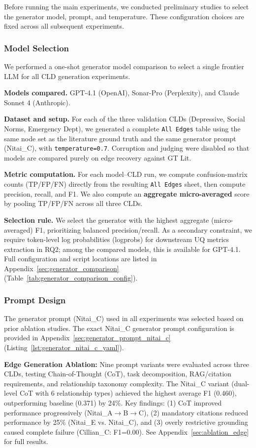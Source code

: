 Before running the main experiments, we conducted preliminary studies to select the generator model, prompt, and temperature. These configuration choices are fixed across all subsequent experiments.

\subsubsection{Model Selection}

We performed a one-shot generator model comparison to select a single frontier LLM for all CLD generation experiments.

\textbf{Models compared.} GPT-4.1 (OpenAI), Sonar-Pro (Perplexity), and Claude Sonnet 4 (Anthropic).

\textbf{Dataset and setup.} For each of the three validation CLDs (Depressive, Social Norms, Emergency Dept), we generated a complete \texttt{All Edges} table using the same node set as the literature ground truth and the same generator prompt (Nitai\_C), with \texttt{temperature=0.7}. Corruption and judging were disabled so that models are compared purely on edge recovery against GT Lit.

\textbf{Metric computation.} For each model--CLD run, we compute confusion-matrix counts (TP/FP/FN) directly from the resulting \texttt{All Edges} sheet, then compute precision, recall, and F1. We also compute an \textbf{aggregate micro-averaged} score by pooling TP/FP/FN across all three CLDs.

\textbf{Selection rule.} We select the generator with the highest aggregate (micro-averaged) F1, prioritizing balanced precision/recall. As a secondary constraint, we require token-level log probabilities (logprobs) for downstream UQ metrics extraction in RQ2; among the compared models, this is available for GPT-4.1.
Full configuration and script locations are listed in Appendix~\ref{sec:generator_comparison} (Table~\ref{tab:generator_comparison_config}).

\subsubsection{Prompt Design}

The generator prompt (Nitai\_C) used in all experiments was selected based on prior ablation studies. The exact Nitai\_C generator prompt configuration is provided in Appendix~\ref{sec:generator_prompt_nitai_c} (Listing~\ref{lst:generator_nitai_c_yaml}).

\textbf{Edge Generation Ablation:} Nine prompt variants were evaluated across three CLDs, testing Chain-of-Thought (CoT), task decomposition, RAG/citation requirements, and relationship taxonomy complexity. The Nitai\_C variant (dual-level CoT with 6 relationship types) achieved the highest average F1 (0.460), outperforming baseline (0.371) by 24\%. Key findings: (1) CoT improved performance progressively (Nitai\_A$\rightarrow$B$\rightarrow$C), (2) mandatory citations reduced performance by 25\% (Nitai\_E vs. Nitai\_C), and (3) overly restrictive grounding caused complete failure (Cillian\_C: F1=0.00). See Appendix~\ref{sec:ablation_edge} for full results.

